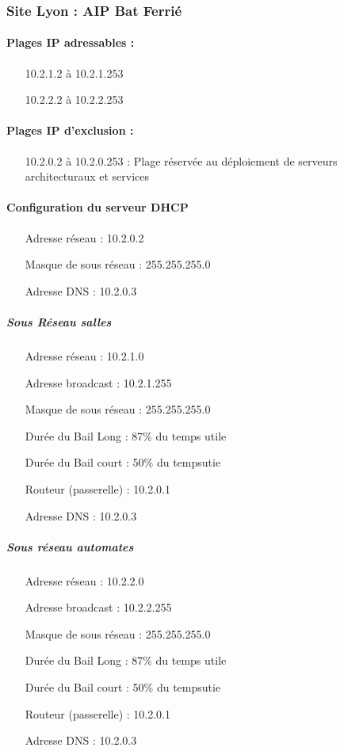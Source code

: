 \documentclass[a4paper]{article}
\begin{document}
\subsubsection{Site Lyon : AIP Bat Ferrié}

\paragraph{Plages IP adressables :} 
\begin{itemize}
\item[10.2.1.2 à 10.2.1.253]
\item[10.2.2.2 à 10.2.2.253]
\end{itemize}

\paragraph{Plages IP d'exclusion :}
\begin{itemize}
\item[10.2.0.2 à 10.2.0.253] : Plage réservée au déploiement de serveurs architecturaux et services
\end{itemize}

\paragraph{Configuration du serveur DHCP}

\begin{itemize}
\item[Adresse réseau]: 10.2.0.2
\item[Masque de sous réseau]: 255.255.255.0
\item[Adresse DNS]: 10.2.0.3
\end{itemize}

\subparagraph{Sous Réseau salles}
\begin{itemize}
\item[Adresse réseau]: 10.2.1.0
\item[Adresse broadcast]: 10.2.1.255
\item[Masque de sous réseau]: 255.255.255.0
\item[Durée du Bail Long]: 87\% du temps utile
\item[Durée du Bail court]: 50\% du tempsutie
\item[Routeur (passerelle)]: 10.2.0.1
\item[Adresse DNS]: 10.2.0.3
\end{itemize}

\subparagraph{Sous réseau automates}
\begin{itemize}
\item[Adresse réseau]: 10.2.2.0
\item[Adresse broadcast]: 10.2.2.255
\item[Masque de sous réseau]: 255.255.255.0
\item[Durée du Bail Long]: 87\% du temps utile
\item[Durée du Bail court]: 50\% du tempsutie
\item[Routeur (passerelle)]: 10.2.0.1
\item[Adresse DNS]: 10.2.0.3
\end{itemize}
\end{document}
